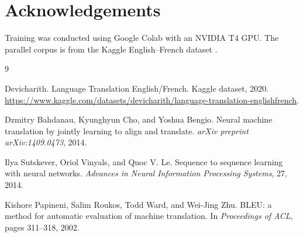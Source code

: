 \documentclass[12pt]{article}
\begin{document}
\section*{Acknowledgements}
Training was conducted using Google Colab with an NVIDIA T4 GPU. The parallel corpus is from the Kaggle English--French dataset \citep{kaggle_enfr}.

\begin{thebibliography}{9}

Devicharith.
\newblock Language Translation English/French.
\newblock Kaggle dataset, 2020.
\newblock \url{https://www.kaggle.com/datasets/devicharith/language-translation-englishfrench}.

Dzmitry Bahdanau, Kyunghyun Cho, and Yoshua Bengio.
\newblock Neural machine translation by jointly learning to align and translate.
\newblock \emph{arXiv preprint arXiv:1409.0473}, 2014.

Ilya Sutskever, Oriol Vinyals, and Quoc V. Le.
\newblock Sequence to sequence learning with neural networks.
\newblock \emph{Advances in Neural Information Processing Systems}, 27, 2014.

Kishore Papineni, Salim Roukos, Todd Ward, and Wei-Jing Zhu.
\newblock BLEU: a method for automatic evaluation of machine translation.
\newblock In \emph{Proceedings of ACL}, pages 311--318, 2002.

\end{thebibliography}
\end{document}
